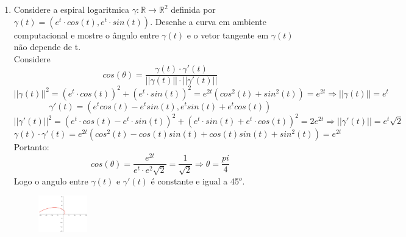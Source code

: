 \documentclass{article}
\begin{document}
\begin{enumerate}
    \item Considere a espiral logaritmica $\gamma : \mathbb{R} \to \mathbb{R}^2$ definida por $\gamma(t) = (e^t \cdot cos(t), e^t \cdot sin(t))$. Desenhe a curva em ambiente computacional e mostre o ângulo entre $\gamma(t)$ e o vetor tangente em $\gamma(t)$ não depende de t. \ 
        \\
        Considere
        $$cos(\theta) = \frac{\gamma(t) \cdot \gamma'(t)}{||\gamma(t)|| \cdot ||\gamma'(t)||}$$
        $$||\gamma(t)||^2 = (e^t \cdot cos(t))^2 + (e^t \cdot sin(t))^2 = e^{2t} (cos^2(t) + sin^2(t)) = e^{2t} \Rightarrow ||\gamma(t)|| = e^t $$
        $$\gamma'(t) = (e^tcos(t)-e^tsin(t), e^tsin(t)+e^tcos(t))$$
        $$||\gamma'(t)||^2 = (e^t \cdot cos(t) - e^t \cdot sin(t))^2 + (e^t \cdot sin(t) + e^t \cdot cos(t))^2 = 2e^{2t} \Rightarrow ||\gamma'(t)|| = e^t\sqrt{2} $$
        $$\gamma(t) \cdot \gamma'(t) = e^{2t}(cos^2(t) - cos(t)sin(t)+cos(t)sin(t) + sin^2(t)) = e^{2t}$$
        Portanto:
        $$cos(\theta) = \frac{e^{2t}}{e^t \cdot e^2\sqrt{2}} = \frac{1}{\sqrt{2}} \Rightarrow \theta = \frac{pi}{4}$$
        Logo o angulo entre $\gamma(t)$ e $\gamma'(t)$ é constante e igual a 45$^o$. \\
        \begin{figure}[!h]
            \centering
            \includegraphics[width=0.2\textwidth]{esp_log.png}
            \label{fig:exercício 7}
        \end{figure}
\end{enumerate}
\end{document}
